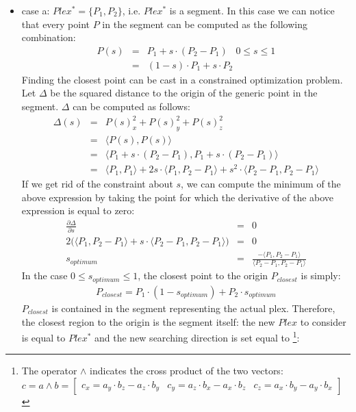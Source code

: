 \documentclass{article}
\begin{document}
\begin{itemize}
\item case a:  $Plex^* = \lbrace P_1 , P_2 \rbrace$, i.e. $Plex^*$ is a segment. In this case we can notice that every point $P$ in the segment can be computed as the following combination:
\begin{eqnarray}
P(s) &=& P_1 + s \cdot (P_2 - P_1) \,\,\,\,\, 0 \leq s \leq 1 \nonumber\\
     &=& (1-s) \cdot P_1 + s \cdot P_2
\end{eqnarray}
Finding the closest point can be cast in a constrained optimization problem. Let $\Delta$ be the squared distance to the origin of the generic point in the segment. $\Delta$ can be computed as follows:
\begin{eqnarray}
\Delta(s) &=&  P(s)_x^2 + P(s)_y^2 + P(s)_z^2  \nonumber\\
&=& \langle P(s), P(s) \rangle \nonumber\\
&=& \langle P_1 + s \cdot (P_2 - P_1), P_1 + s \cdot (P_2 - P_1) \rangle \nonumber\\
&=& \langle P_1 , P_1 \rangle + 2 s \cdot \langle P_1 , P_2 - P_1 \rangle + s^2 \cdot \langle P_2 - P_1 , P_2 - P_1 \rangle
\end{eqnarray}
If we get rid of the constraint about $s$, we can compute the minimum of the above expression by taking the point for which 
the derivative of the above expression is equal to zero:
\begin{eqnarray}
\frac{\partial \Delta}{\partial s} &=& 0 \nonumber\\
2 \big( \langle P_1, P_2 - P_1 \rangle + s \cdot \langle P_2 - P_1, P_2 - P_1 \rangle \big) &=& 0 \nonumber\\
s_{optimum} &=& \frac{-\langle P_1, P_2 - P_1 \rangle}{\langle P_2 - P_1, P_2 - P_1 \rangle}
\end{eqnarray}
In the case $0 \leq s_{optimum} \leq 1 $, the closest point to the origin $P_{closest}$ is simply:
\begin{eqnarray}
P_{closest} = P_1 \cdot (1 - s_{optimum}) + P_2 \cdot s_{optimum}
\label{eq:mix_seg_01}
\end{eqnarray}  
$P_{closest}$ is contained in the segment representing the actual plex. Therefore, the closest region to the origin is the segment itself: the new $Plex$ to consider is equal to  $Plex^*$ and the new searching direction is set equal to \footnote{The operator $\wedge$ indicates the cross product of the two vectors: $c = a \wedge b = \begin{bmatrix} c_x = a_y \cdot b_z - a_z \cdot b_y  & c_y = a_z \cdot b_x - a_x \cdot b_z & c_z = a_x \cdot b_y - a_y \cdot b_x \end{bmatrix}$}:

\end{itemize}
\end{document}
